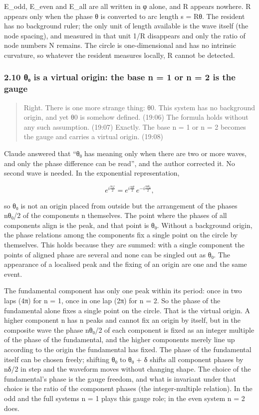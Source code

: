 \documentclass[
  a4paper,
]{article}
\newcounter{none} %
\begin{document}
E\_odd, E\_even and E\_all are all written in φ alone, and R appears
nowhere. R appears only when the phase θ is converted to arc length s =
Rθ. The resident has no background ruler; the only unit of length
available is the wave itself (the node spacing), and measured in that
unit 1/R disappears and only the ratio of node numbers N remains. The
circle is one-dimensional and has no intrinsic curvature, so whatever
the resident measures locally, R cannot be detected.

\subsubsection{2.10 θ₀ is a virtual origin: the base n = 1 or n = 2 is
the
gauge}\label{ux3b8ux2080-is-a-virtual-origin-the-base-n-1-or-n-2-is-the-gauge}

\begin{quote}
Right. There is one more strange thing: θ0. This system has no
background origin, and yet θ0 is somehow defined. (19:06) The formula
holds without any such assumption. (19:07) Exactly. The base n = 1 or n
= 2 becomes the gauge and carries a virtual origin. (19:08)
\end{quote}

Claude answered that ``θ₀ has meaning only when there are two or more
waves, and only the phase difference can be read'', and the author
corrected it. No second wave is needed. In the exponential
representation,

\[
e^{i\frac{n\varphi}{2}}=e^{i\frac{n\theta}{2}}\,e^{-i\frac{n\theta_0}{2}},
\]

so θ₀ is not an origin placed from outside but the arrangement of the
phases nθ₀/2 of the components n themselves. The point where the phases
of all components align is the peak, and that point is θ₀. Without a
background origin, the phase relations among the components fix a single
point on the circle by themselves. This holds because they are summed:
with a single component the points of aligned phase are several and none
can be singled out as θ₀. The appearance of a localised peak and the
fixing of an origin are one and the same event.

The fundamental component has only one peak within its period: once in
two laps (4π) for n = 1, once in one lap (2π) for n = 2. So the phase of
the fundamental alone fixes a single point on the circle. That is the
virtual origin. A higher component n has n peaks and cannot fix an
origin by itself, but in the composite wave the phase nθ₀/2 of each
component is fixed as an integer multiple of the phase of the
fundamental, and the higher components merely line up according to the
origin the fundamental has fixed. The phase of the fundamental itself
can be chosen freely; shifting θ₀ to θ₀ + δ shifts all component phases
by nδ/2 in step and the waveform moves without changing shape. The
choice of the fundamental's phase is the gauge freedom, and what is
invariant under that choice is the ratio of the component phases (the
integer-multiple relation). In the odd and the full systems n = 1 plays
this gauge role; in the even system n = 2 does.
\end{document}
